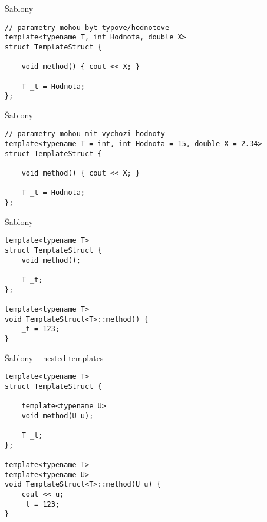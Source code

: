 \begin{frame}[fragile]
\begin{exampleblock}{Šablony} 
\begin{lstlisting}
// parametry mohou byt typove/hodnotove
template<typename T, int Hodnota, double X>
struct TemplateStruct {
	
	void method() { cout << X; }
	
	T _t = Hodnota;
};
\end{lstlisting}
\end{exampleblock}
\end{frame}


\begin{frame}[fragile]
\begin{exampleblock}{Šablony} 
\begin{lstlisting}
// parametry mohou mit vychozi hodnoty
template<typename T = int, int Hodnota = 15, double X = 2.34>
struct TemplateStruct {
	
	void method() { cout << X; }
	
	T _t = Hodnota;
};
\end{lstlisting}
\end{exampleblock}
\end{frame}



\begin{frame}[fragile]
\begin{exampleblock}{Šablony} 
\begin{lstlisting}
template<typename T>
struct TemplateStruct {
	void method();
	
	T _t;
};

template<typename T>
void TemplateStruct<T>::method() {
	_t = 123;
}
\end{lstlisting}
\end{exampleblock}
\end{frame}


\begin{frame}[fragile]
\begin{exampleblock}{Šablony -- nested templates} 
\begin{lstlisting}
template<typename T>
struct TemplateStruct {

	template<typename U>
	void method(U u);
	
	T _t;
};

template<typename T>
template<typename U>
void TemplateStruct<T>::method(U u) {
	cout << u;
	_t = 123;
}
\end{lstlisting}
\end{exampleblock}
\end{frame}



